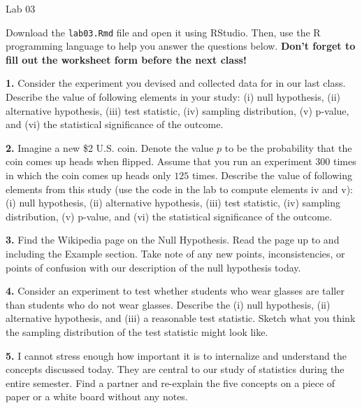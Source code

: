 \documentclass{tufte-handout}
\begin{document}
\justify

{\LARGE Lab 03}

\vspace*{18pt}

Download the \texttt{lab03.Rmd} file and open it using RStudio. Then, use the
R programming language to help you answer the questions below. \textbf{Don't
forget to fill out the worksheet form before the next class!}

\vspace*{12pt}

\textbf{1.} Consider the experiment you devised and collected data for in our
last class. Describe the value of following elements in your study:
(i) null hypothesis, (ii) alternative hypothesis, (iii) test statistic,
(iv) sampling distribution, (v) p-value, and (vi) the statistical significance
of the outcome.

\textbf{2.} Imagine a new \$2 U.S. coin. Denote the value $p$ to be the
probability that the coin comes up heads when flipped. Assume that you run an
experiment $300$ times in which the coin comes up heads only $125$ times.
Describe the value of following elements from this study (use the code in the
lab to compute elements iv and v): (i) null hypothesis, (ii) alternative
hypothesis, (iii) test statistic, (iv) sampling distribution, (v) p-value,
and (vi) the statistical significance of the outcome.

\textbf{3.} Find the Wikipedia page on the Null Hypothesis. Read the page up
to and including the Example section. Take note of any new points,
inconsistencies, or points of confusion with our description of the null
hypothesis today.

\textbf{4.} Consider an experiment to test whether students who wear glasses
are taller than students who do not wear glasses. Describe the
(i) null hypothesis, (ii) alternative hypothesis, and (iii) a reasonable
test statistic. Sketch what you think the sampling distribution of the test
statistic might look like.

\textbf{5.} I cannot stress enough how important it is to internalize and
understand the concepts discussed today. They are central to our study of
statistics during the entire semester. Find a partner and re-explain the
five concepts on a piece of paper or a white board without any notes.
\end{document}
